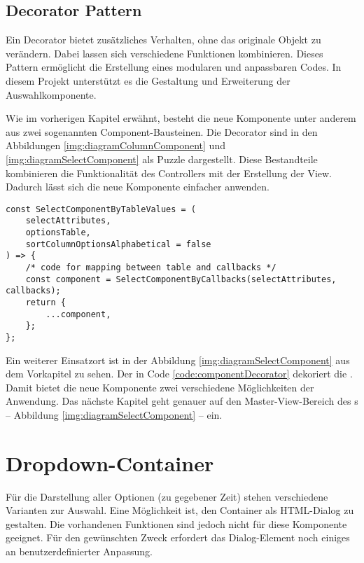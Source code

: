 \subsection{Decorator Pattern}
\label{sec:decoratorPattern}

Ein Decorator bietet zusätzliches Verhalten, ohne das originale Objekt zu verändern. 
Dabei lassen sich verschiedene Funktionen kombinieren. 
Dieses Pattern ermöglicht die Erstellung eines modularen und anpassbaren Codes. 
In diesem Projekt unterstützt es die Gestaltung und Erweiterung der Auswahlkomponente. 

Wie im vorherigen Kapitel erwähnt, besteht die neue Komponente unter anderem aus zwei sogenannten Component-Bausteinen. 
Die Decorator sind in den Abbildungen \ref{img:diagramColumnComponent} und \ref{img:diagramSelectComponent} als Puzzle dargestellt. 
Diese Bestandteile kombinieren die Funktionalität des Controllers mit der Erstellung der View. 
Dadurch lässt sich die neue Komponente einfacher anwenden. 

\begin{lstlisting}[style = htmlcssjs, caption = \codestyle{SelectComponentByTableValues} dekoriert \codestyle{SelectComponentByCallbacks}, label = code:componentDecorator]
const SelectComponentByTableValues = (
    selectAttributes,
    optionsTable,
    sortColumnOptionsAlphabetical = false
) => {
    /* code for mapping between table and callbacks */
    const component = SelectComponentByCallbacks(selectAttributes, callbacks);
    return {
        ...component,
    };
};
\end{lstlisting}

Ein weiterer Einsatzort ist in der Abbildung \ref{img:diagramSelectComponent} aus dem Vorkapitel zu sehen. 
Der  in Code \ref{code:componentDecorator} dekoriert die . 
Damit bietet die neue Komponente zwei verschiedene Möglichkeiten der Anwendung. 
Das nächste Kapitel geht genauer auf den Master-View-Bereich des s – Abbildung \ref{img:diagramSelectComponent} – ein. 


\section{Dropdown-Container}
\label{sec:dropdownContainer}

Für die Darstellung aller Optionen (zu gegebener Zeit) stehen verschiedene Varianten zur Auswahl. 
Eine Möglichkeit ist, den Container als HTML-Dialog zu gestalten. 
Die vorhandenen Funktionen sind jedoch nicht für diese Komponente geeignet. 
Für den gewünschten Zweck erfordert das Dialog-Element noch einiges an benutzerdefinierter Anpassung. 

